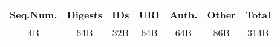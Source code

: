 \documentclass{standalone}
\begin{document}
\begin{tabular}{cccccc|c}
    \hline
    Seq.Num. & Digests & IDs & URI & Auth. & Other & Total \\ \hline
    4B       & 64B     & 32B & 64B & 64B   & 86B   & 314B
\end{tabular}%
\end{document}
